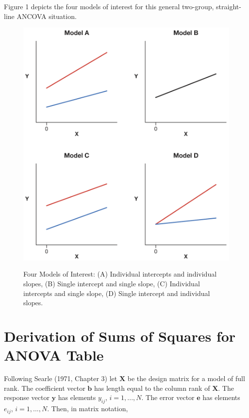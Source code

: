 \documentclass[11pt, oneside]{article}   	%
\begin{document}
Figure 1 depicts the four models of interest for this general two-group, straight-line ANCOVA situation. 
\begin{center}
\begin{figure}
\includegraphics[scale = 0.9]{205940_Slope_Intercept_Graphs_Labels.png} 
\label{Fig. 1}
\caption{Four Models of Interest: (A) Individual intercepts and individual slopes, (B) Single intercept and single slope, (C) Individual intercepts and single slope, (D) Single intercept and individual slopes.}
\end{figure}
\end{center}

\section{Derivation of Sums of Squares for ANOVA Table}
Following Searle (1971, Chapter 3) let $\mathbf{X}$ be the design matrix for a model of full rank.  The coefficient vector $\mathbf{b}$ has length equal to the column rank of $\mathbf{X}$.  The response vector $\mathbf{y}$ has elements $y_{ij}$, $i = 1, ..., N$. The error vector  $\mathbf{e}$ has elements $e_{ij}$, $i = 1, ..., N $.  Then, in matrix notation,  
\end{document}
